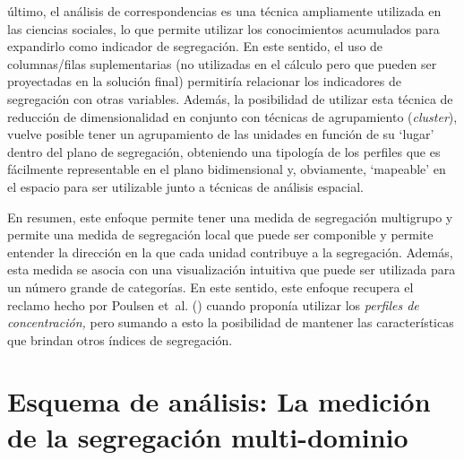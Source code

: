 \documentclass[
  spanish,
  a4paper,%
  chapterprefix=true,%
  DIV=calc,%
  twoside]{scrbook}%
\begin{document}
último, el análisis de correspondencias es una técnica ampliamente
utilizada en las ciencias sociales, lo que permite utilizar los
conocimientos acumulados para expandirlo como indicador de segregación.
En este sentido, el uso de columnas/filas suplementarias (no utilizadas
en el cálculo pero que pueden ser proyectadas en la solución final)
permitiría relacionar los indicadores de segregación con otras
variables. Además, la posibilidad de utilizar esta técnica de reducción
de dimensionalidad en conjunto con técnicas de agrupamiento (\emph{cluster}),
vuelve posible tener un agrupamiento de las unidades en función de su
`lugar' dentro del plano de segregación, obteniendo una tipología de los
perfiles que es fácilmente representable en el plano bidimensional y,
obviamente, `mapeable' en el espacio para ser utilizable junto a
técnicas de análisis espacial.

En resumen, este enfoque permite tener una medida de segregación
multigrupo y permite una medida de segregación local que puede ser
componible y permite entender la dirección en la que cada unidad
contribuye a la segregación. Además, esta medida se asocia con una
visualización intuitiva que puede ser utilizada para un número grande de
categorías. En este sentido, este enfoque recupera el reclamo hecho por
Poulsen et~al. () cuando proponía utilizar los \emph{perfiles de concentración,}
pero sumando a esto la posibilidad de mantener las características que
brindan otros índices de segregación.

\section{Esquema de análisis: La medición de la segregación multi-dominio}\label{method-scheme}
\end{document}
